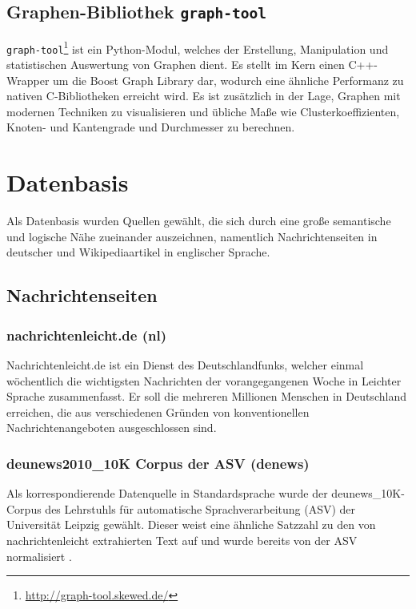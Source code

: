 \documentclass[11pt, a4paper]{article}
\begin{document}
\subsection{Graphen-Bibliothek \texttt{graph-tool}}
\texttt{graph-tool}\footnote{\url{http://graph-tool.skewed.de/}} ist ein
Python-Modul, welches der Erstellung, Manipulation und statistischen
Auswertung von Graphen dient. Es stellt im Kern einen C++-Wrapper um die Boost
Graph Library dar, wodurch eine \"ahnliche Performanz zu nativen C-Bibliotheken
erreicht wird. Es ist zus\"atzlich in der Lage, Graphen mit modernen Techniken
zu visualisieren und \"ubliche Ma\ss{}e wie Clusterkoeffizienten, Knoten-
und Kantengrade und Durchmesser zu berechnen.


\section{Datenbasis}
\label{sec:datenbasis}

Als Datenbasis wurden Quellen gew\"ahlt, die sich durch eine gro\ss{}e
semantische und logische N\"ahe zueinander auszeichnen, namentlich
Nachrichtenseiten in deutscher und Wikipediaartikel in englischer Sprache.

\subsection{Nachrichtenseiten}
\label{nrseiten}

\subsubsection{nachrichtenleicht.de (nl)}

Nachrichtenleicht.de ist ein Dienst des Deutschlandfunks, welcher einmal
w\"ochentlich die wichtigsten Nachrichten der vorangegangenen Woche in Leichter
Sprache zusammenfasst. Er soll die mehreren Millionen Menschen in Deutschland
erreichen, die aus verschiedenen Gr\"unden von konventionellen
Nachrichtenangeboten ausgeschlossen sind.

\subsubsection{deunews2010\_10K Corpus der ASV (denews)}

Als korrespondierende Datenquelle in Standardsprache wurde der
deunews\_10K-Corpus des Lehrstuhls f\"ur automatische Sprachverarbeitung
(ASV) der Universit\"at Leipzig gew\"ahlt. Dieser weist eine \"ahnliche Satzzahl
zu den von nachrichtenleicht extrahierten Text auf und wurde bereits von der ASV
normalisiert \cite{Quasthoff2006}.
\end{document}

